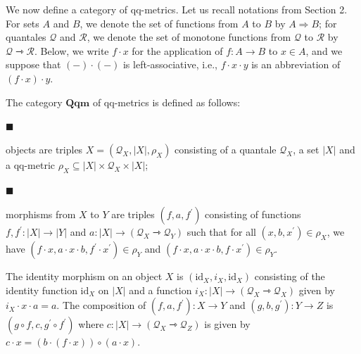  
We now define a category of qq-metrics. Let us recall notations from Section 2. For sets $A$ and $B$, we denote the set of functions from $A$ to $B$ by $A\Rightarrow B$; for quantales $\mathcal{Q}$ and $\mathcal{R}$, we denote the set of monotone functions from $\mathcal{Q}$ to $\mathcal{R}$ by $\mathcal{Q}\rightarrowtriangle\mathcal{R}$. Below, we write $f\cdot x$ for the application of $f\colon A\to B$ to $x\in A$, and we suppose that $(-)\cdot(-)$ is left-associative, i.e., $f\cdot x\cdot y$ is an abbreviation of $(f\cdot x)\cdot y$.\par
 
 
 
The category $\mathbf{Qqm}$ of qq-metrics is defined as follows:\par
  
\par\noindent  $\blacksquare$ 
 
objects are triples $X=(\mathcal{Q}_{X},|X|,\rho_{X})$ consisting of a quantale $\mathcal{Q}_{X}$, a set $|X|$ and a qq-metric $\rho_{X}\subseteq|X|\times\mathcal{Q}_{X}\times|X|$;\par
 
 
 
\par\noindent  $\blacksquare$ 
 
morphisms from $X$ to $Y$ are triples $(f,a,f^{\prime})$ consisting of functions $f,f^{\prime}\colon|X|\to|Y|$ and $a\colon|X|\to(\mathcal{Q}_{X}\rightarrowtriangle\mathcal{Q}_{Y})$ such that for all $(x,b,x^{\prime})\in\rho_{X}$, we have $(f\cdot x,a\cdot x\cdot b,f^{\prime}\cdot x^{\prime})\in\rho_{Y}$ and $(f\cdot x,a\cdot x\cdot b,f\cdot x^{\prime})\in\rho_{Y}$.\par
 
 
  
The identity morphism on an object $X$ is $(\mathrm{id}_{X},i_{X},\mathrm{id}_{X})$ consisting of the identity function $\mathrm{id}_{X}$ on $|X|$ and a function $i_{X}\colon|X|\to(\mathcal{Q}_{X}\rightarrowtriangle\mathcal{Q}_{X})$ given by $i_{X}\cdot x\cdot a=a$. The composition of $(f,a,f^{\prime})\colon X\to Y$ and $(g,b,g^{\prime})\colon Y\to Z$ is $(g\circ f,c,g^{\prime}\circ f^{\prime})$ where $c\colon|X|\to(\mathcal{Q}_{X}\rightarrowtriangle\mathcal{Q}_{Z})$ is given by $c\cdot x=(b\cdot(f\cdot x))\circ(a\cdot x)$.\par
 
